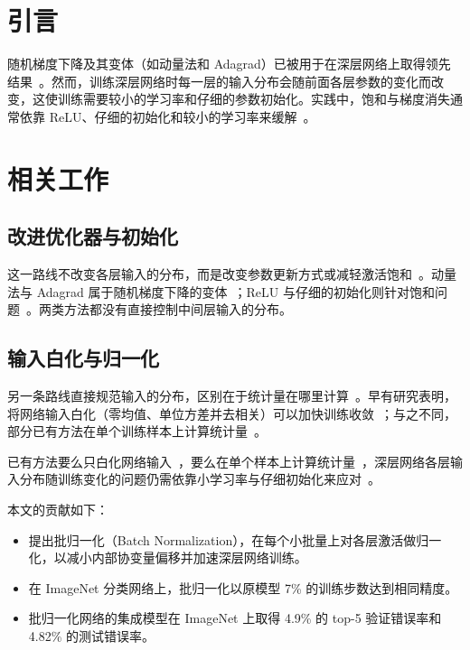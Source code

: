 \section{引言}

随机梯度下降及其变体（如动量法和 Adagrad）已被用于在深层网络上取得领先结果~\cite{sutskever2013,duchi2011}。然而，训练深层网络时每一层的输入分布会随前面各层参数的变化而改变，这使训练需要较小的学习率和仔细的参数初始化。实践中，饱和与梯度消失通常依靠 ReLU、仔细的初始化和较小的学习率来缓解~\cite{nair2010,bengio2010}。

\section{相关工作}

\subsection{改进优化器与初始化}

这一路线不改变各层输入的分布，而是改变参数更新方式或减轻激活饱和~\cite{sutskever2013,nair2010}。动量法与 Adagrad 属于随机梯度下降的变体~\cite{sutskever2013,duchi2011}；ReLU 与仔细的初始化则针对饱和问题~\cite{nair2010,bengio2010}。两类方法都没有直接控制中间层输入的分布。

\subsection{输入白化与归一化}

另一条路线直接规范输入的分布，区别在于统计量在哪里计算~\cite{lecun1998a,lyu2008}。早有研究表明，将网络输入白化（零均值、单位方差并去相关）可以加快训练收敛~\cite{lecun1998a,wiesler2011}；与之不同，部分已有方法在单个训练样本上计算统计量~\cite{lyu2008}。

已有方法要么只白化网络输入~\cite{lecun1998a}，要么在单个样本上计算统计量~\cite{lyu2008}，深层网络各层输入分布随训练变化的问题仍需依靠小学习率与仔细初始化来应对~\cite{nair2010}。

本文的贡献如下：

\begin{itemize}
\item 提出批归一化（Batch Normalization），在每个小批量上对各层激活做归一化，以减小内部协变量偏移并加速深层网络训练。
\item 在 ImageNet 分类网络上，批归一化以原模型 7\% 的训练步数达到相同精度。
\item 批归一化网络的集成模型在 ImageNet 上取得 4.9\% 的 top-5 验证错误率和 4.82\% 的测试错误率。
\end{itemize}
